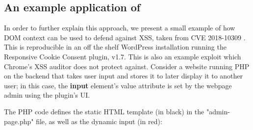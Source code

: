 \subsection{An example application of \sys} \label{motivating_example}

In order to further explain this approach, we present a small example of how DOM context can be used to defend against XSS, taken from CVE 2018-10309 \cite{examplecve}. This is reproducible in an off the shelf WordPress installation running the Responsive Cookie Consent plugin, v1.7. This is also an example exploit which Chrome's XSS auditor does not protect against. Consider a website running PHP on the backend that takes user input and stores it to later display it to another user; in this case, the \textbf{input} element's value attribute is set by the webpage admin using the plugin's UI.

The PHP code defines the static HTML template (in black) in the "admin-page.php" file, as well as the dynamic input (in red):

